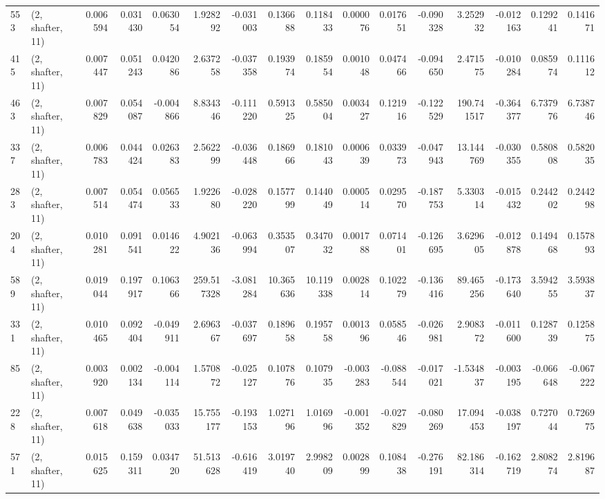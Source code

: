 \begin{tabular}{llrrrrrrrrrrrrrr}
553 &  (2, shafter, 11) &   0.006594 &  0.031430 &  0.063054 &    1.928292 & -0.031003 &   0.136688 &   0.118433 &  0.000076 &  0.017651 & -0.090328 &    3.252932 & -0.012163 &   0.129241 &   0.141671 \\
415 &  (2, shafter, 11) &   0.007447 &  0.051243 &  0.042086 &    2.637258 & -0.037358 &   0.193974 &   0.185954 &  0.001048 &  0.047466 & -0.094650 &    2.471575 & -0.010284 &   0.085974 &   0.111612 \\
463 &  (2, shafter, 11) &   0.007829 &  0.054087 & -0.004866 &    8.834346 & -0.111220 &   0.591325 &   0.585004 &  0.003427 &  0.121916 & -0.122529 &  190.741517 & -0.364377 &   6.737976 &   6.738746 \\
337 &  (2, shafter, 11) &   0.006783 &  0.044424 &  0.026383 &    2.562299 & -0.036448 &   0.186966 &   0.181043 &  0.000639 &  0.033973 & -0.047943 &   13.144769 & -0.030355 &   0.580808 &   0.582035 \\
283 &  (2, shafter, 11) &   0.007514 &  0.054474 &  0.056533 &    1.922680 & -0.028220 &   0.157799 &   0.144049 &  0.000514 &  0.029570 & -0.187753 &    5.330314 & -0.015432 &   0.244202 &   0.244298 \\
204 &  (2, shafter, 11) &   0.010281 &  0.091541 &  0.014622 &    4.902136 & -0.063994 &   0.353507 &   0.347032 &  0.001788 &  0.071401 & -0.126695 &    3.629605 & -0.012878 &   0.149468 &   0.157893 \\
589 &  (2, shafter, 11) &   0.019044 &  0.197917 &  0.106366 &  259.517328 & -3.081284 &  10.365636 &  10.119338 &  0.002814 &  0.102279 & -0.136416 &   89.465256 & -0.173640 &   3.594255 &   3.593837 \\
331 &  (2, shafter, 11) &   0.010465 &  0.092404 & -0.049911 &    2.696367 & -0.037697 &   0.189658 &   0.195758 &  0.001396 &  0.058546 & -0.026981 &    2.908372 & -0.011600 &   0.128739 &   0.125875 \\
85  &  (2, shafter, 11) &   0.003920 &  0.002134 & -0.004114 &    1.570872 & -0.025127 &   0.107876 &   0.107935 & -0.003283 & -0.088544 & -0.017021 &   -1.534837 & -0.003195 &  -0.066648 &  -0.067222 \\
228 &  (2, shafter, 11) &   0.007618 &  0.049638 & -0.035033 &   15.755177 & -0.193153 &   1.027196 &   1.016996 & -0.001352 & -0.027829 & -0.080269 &   17.094453 & -0.038197 &   0.727044 &   0.726975 \\
571 &  (2, shafter, 11) &   0.015625 &  0.159311 &  0.034720 &   51.513628 & -0.616419 &   3.019740 &   2.998209 &  0.002899 &  0.108438 & -0.276191 &   82.186314 & -0.162719 &   2.808274 &   2.819687 \\

\end{tabular}
